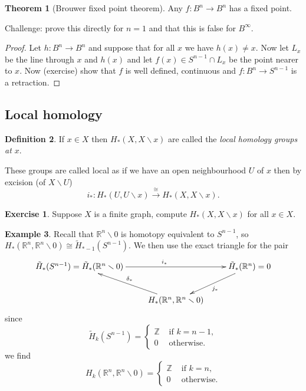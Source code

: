\documentclass[12pt]{article}
\theoremstyle{definition}
\newtheorem{thm}{Theorem}[subsection]
\theoremstyle{definition}
\newtheorem{defn}[thm]{Definition}
\newtheorem{ex}[thm]{Example}
\newtheorem*{exer}{Exercise}
\newcommand{\ZZ}{\mathbb{Z}}
\newcommand{\RR}{\mathbb{R}}
\renewcommand{\H}{H_*}
\begin{document}
\begin{thm}[Brouwer fixed point theorem]
Any $f\colon B^n \to B^n$ has a fixed point.
\end{thm}
Challenge: prove this directly for $n=1$ and that this is false for $B^\infty$.
\begin{proof}
Let $h\colon B^n \to B^n$ and suppose that for all $x$ we have $h(x) \ne x$.
Now let $L_x$ be the line through $x$ and $h(x)$ and let $f(x) \in S^{n-1} \cap L_x$ be the point nearer to $x$.
Now (exercise) show that $f$ is well defined, continuous and $f\colon B^n \to S^{n-1}$ is a retraction.
\end{proof}

\subsection{Local homology}
\begin{defn}
If $x \in X$ then $\H(X,X\smallsetminus x)$ are called the \emph{local homology groups at $x$}.
\end{defn}
These groups are called local as if we have an open neighbourhood $U$ of $x$ then by excision (of $X\smallsetminus U$)
\[
i_*\colon \H(U,U\smallsetminus x) \xrightarrow{\cong} \H(X, X\smallsetminus x).
\]

\begin{exer}
Suppose $X$ is a finite graph, compute $\H(X,X\smallsetminus x)$ for all $x\in X$.
\end{exer}

\begin{ex}
Recall that $\RR^n \smallsetminus 0$ is homotopy equivalent to $S^{n-1}$, so $\H(\RR^n, \RR^n\smallsetminus 0) \cong \tilde H_{*-1}(S^{n-1})$.
We then use the exact triangle for the pair
\[
\xymatrix
{
 \tilde\H(S^{n-1})=\tilde \H (\RR^n \smallsetminus 0)\ar[rr]^{i_*} & & \tilde \H(\RR^n)=0\ar[dl]^{j_*} \\
 &\H(\RR^n, \RR^n\smallsetminus 0) \ar[ul]_{\delta_*}&
}
\]
since
\[
\tilde H_k(S^{n-1}) =\begin{cases}\ZZ &\text{ if } k = n-1,\\
0 &\text{ otherwise}.
\end{cases}
\]
we find
\[
H_k(\RR^n,\RR^n\smallsetminus 0) =\begin{cases}\ZZ &\text{ if } k = n,\\
0 &\text{ otherwise}.
\end{cases}
\]
\end{ex}
\end{document}

